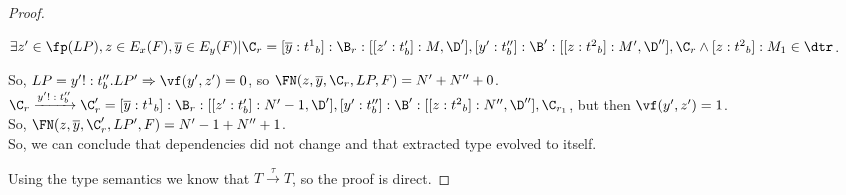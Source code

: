 \begin{proof}
\begin{itemize}
$\exists z'\in \fp(LP), z \in E_x(F),\overline{y}\in E_y(F)|   \C_r=[\overline{y}:{t^1}_b]:\B_r:[[z':t_b']:M,\D'],[y':t_b'']:\B':[[z:{t^2}_b]:M',\D''],\C_r \wedge [z:{t^2}_b]:M_1 \in \dtr$.

So, $LP=y'!:t_b''.LP'\Rightarrow \vf(y',z')=0$, so $\FN(z,\overline{y},\C_r,LP,F)=N'+N''+0$.\\

$\C_r\xrightarrow{\text{$y'!:t_b''$}}\C_r'=[\overline{y}:{t^1}_b]:\B_r:[[z':t_b']:N'-1,\D'],[y':t_b'']:\B':[[z:{t^2}_b]:N'',\D''],\C_{r_1 }$, but then $\vf(y',z')=1$.\\

So, $\FN(z,\overline{y},\C_r',LP',F)=N'-1+N''+1$.\\


So, we can conclude that dependencies did not change and that extracted type evolved to itself.





\end{itemize}

Using the type semantics we know that $T\xrightarrow{\text{$\tau$}}T$, so the proof is direct.











\end{proof}




